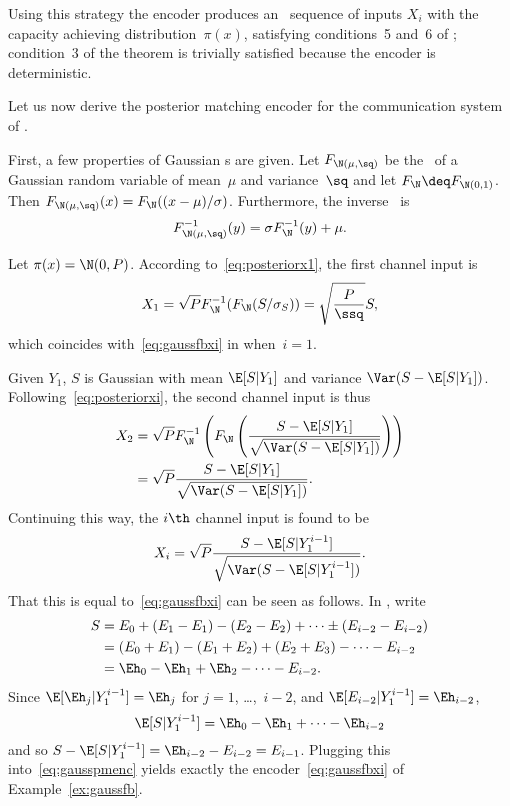 Using this strategy the encoder produces an \iid\ sequence of inputs $X_i$
with the capacity achieving distribution~$\pi(x)$, satisfying conditions~5
and~6 of ; condition~3 of the theorem is
trivially satisfied because the encoder is deterministic.

Let us now derive the posterior matching encoder for the communication system of
.

\begin{example}
  \label{ex:gaussfbpost}
  First, a few properties of Gaussian \cdf s are given. Let $F_{\N(\mu, \sq)}$
  be the \cdf\ of a Gaussian random variable of mean~$\mu$ and variance~$\sq$
  and let $F_\N \deq F_{\N(0,1)}$. Then $F_{\N(\mu,\sq)}(x) =
  F_\N((x-\mu)/\sigma)$. Furthermore, the inverse \cdf\ is 
  \begin{equation*}
    F_{\N(\mu,\sq)}^{-1}(y) = \sigma F_\N^{-1}(y) + \mu.
  \end{equation*}

  Let $\pi(x) = \N(0,P)$. According to~\eqref{eq:posteriorx1}, the first channel
  input is
  \begin{equation*}
    X_1 = \sqrt{P} F_{\N}^{-1}(F_{\N}(S/\sigma_S)) = \sqrt{\frac{P}{\ssq}} S,
  \end{equation*}
  which coincides with~\eqref{eq:gaussfbxi} in  when~$i=1$.

  Given $Y_1$, $S$ is Gaussian with mean $\E[S|Y_1]$ and variance $\Var(S -
  \E[S|Y_1])$. Following~\eqref{eq:posteriorxi}, the second channel input is
  thus
  \begin{align*}
    X_2 &= \sqrt P F_{\N}^{-1} \left( F_{\N} \left( \frac{S - \E[S|Y_1]}
    {\sqrt{\Var(S-\E[S|Y_1])}} \right) \right) \\
    &= \sqrt{P} \frac{S - \E[S|Y_1]}{\sqrt{\Var(S-\E[S|Y_1])}}.
  \end{align*}
  Continuing this way, the $i\th$ channel input is found to be
  \begin{equation}
    \label{eq:gausspmenc}
    X_i = \sqrt{P} \frac{S - \E[S|Y_1^{i-1}]}{\sqrt{\Var(S-\E[S|Y_1^{i-1}])}}.
  \end{equation}
  That this is equal to~\eqref{eq:gaussfbxi} can be seen as follows. In
  , write
  \begin{align*}
    S &= E_0 + (E_1 - E_1) - (E_2 - E_2) + \dots \pm (E_{i-2} -
    E_{i-2}) \\
    &= (E_0 + E_1) - (E_1 + E_2) + (E_2 + E_3) - \dots - E_{i-2} \\
    &= \Eh_0 - \Eh_1 + \Eh_2 - \dots - E_{i-2}.
  \end{align*}
  Since $\E[\Eh_j | Y_1^{i-1}] = \Eh_j$ for $j = 1$, \dots,~$i-2$, and
  $\E[E_{i-2}|Y_1^{i-1}] = \Eh_{i-2}$, 
  \begin{equation*}
    \E[S|Y_1^{i-1}] = \Eh_0 - \Eh_1 + \dots  - \Eh_{i-2}
  \end{equation*}
  and so $S - \E[S|Y_1^{i-1}] = \Eh_{i-2} - E_{i-2} = E_{i-1}$. Plugging this
  into~\eqref{eq:gausspmenc} yields exactly the encoder~\eqref{eq:gaussfbxi} of
  Example~\ref{ex:gaussfb}.
\end{example}

